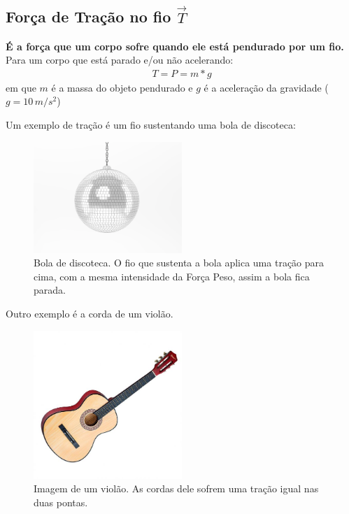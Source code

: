\documentclass[12pt]{extarticle}
\newcommand{\<}{\langle}
\renewcommand{\>}{\rangle}
\theoremstyle{definition}
\begin{document}
\subsection{Força de Tração no fio $\vec{T}$}

\textbf{É a força que um corpo sofre quando ele está pendurado por um fio.} Para um corpo que está parado e/ou não acelerando:
\begin{align}
    T = P = m*g
\end{align}
\noindent em que $m$ é a massa do objeto pendurado e $g$ é a aceleração da gravidade ($g = 10\,m/s^2$)

Um exemplo de tração é um fio sustentando uma bola de discoteca:

\begin{figure}[h]
    \centering
    \includegraphics[width=0.5\textwidth]{discoball.png}
    \caption{Bola de discoteca. O fio que sustenta a bola aplica uma tração para cima, com a mesma intensidade da Força Peso, assim a bola fica parada.}
    \label{fig:my_label}
\end{figure}

Outro exemplo é a corda de um violão.
\begin{figure}[H]
    \centering
    \includegraphics[width=0.5\textwidth]{violao-queens-com-cordas-de-aco-para-iniciante_261061_2.jpg}
    \caption{Imagem de um violão. As cordas dele sofrem uma tração igual nas duas pontas.}
    \label{fig:guitar}
\end{figure}
\end{document}

